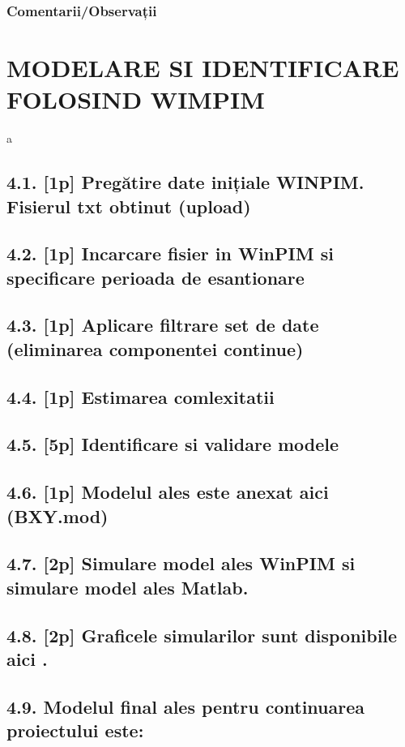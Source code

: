 \documentclass[12pt,english]{article}
\begin{document}
\subsubsection { Comentarii/Observații }

\section { MODELARE SI IDENTIFICARE FOLOSIND WIMPIM }
a
\subsection {4.1. [1p] Pregătire date inițiale WINPIM. Fisierul txt obtinut (upload) }
\subsection {4.2. [1p] Incarcare fisier in WinPIM si specificare perioada de esantionare }
\subsection {4.3. [1p] Aplicare filtrare set de date (eliminarea componentei continue) }
\subsection {4.4. [1p] Estimarea comlexitatii}
\subsection {4.5. [5p]  Identificare si validare modele }
\subsection {4.6. [1p] Modelul ales este anexat aici (BXY.mod) }
\subsection {4.7. [2p] Simulare model ales WinPIM si simulare model ales Matlab. }
\subsection {4.8. [2p]  Graficele simularilor sunt disponibile aici .  }
\subsection {4.9. Modelul final ales pentru continuarea proiectului este: }
\end{document}
